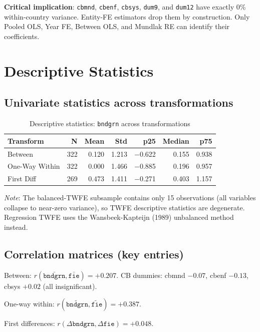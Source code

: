 \documentclass[12pt,a4paper]{article}
\begin{document}
\noindent\textbf{Critical implication}: \texttt{cbmnd}, \texttt{cbenf},
\texttt{cbsys}, \texttt{dum9}, and \texttt{dum12} have exactly 0\%
within-country variance. Entity-FE estimators drop them by construction.
Only Pooled OLS, Year FE, Between OLS, and Mundlak RE can identify their
coefficients.

\section{Descriptive Statistics}

\subsection{Univariate statistics across transformations}

\begin{table}[H]
\centering
\caption{Descriptive statistics: \texttt{bndgrn} across transformations}
\label{tab:desc}
\begin{tabular}{lrrrrrr}
\toprule
Transform & N & Mean & Std & p25 & Median & p75 \\
\midrule
Between        & 322 &  0.120 & 1.213 & $-$0.622 &  0.155 & 0.938 \\
One-Way Within & 322 &  0.000 & 1.466 & $-$0.885 &  0.196 & 0.957 \\
First Diff     & 269 &  0.473 & 1.411 & $-$0.271 &  0.403 & 1.157 \\
\bottomrule
\end{tabular}
\end{table}

\noindent\textit{Note}: The balanced-TWFE subsample contains only 15
observations (all variables collapse to near-zero variance), so TWFE
descriptive statistics are degenerate. Regression TWFE uses the
Wansbeek-Kapteijn (1989) unbalanced method instead.

\subsection{Correlation matrices (key entries)}

Between: $r(\bar{\texttt{bndgrn}}, \bar{\texttt{fie}}) = +0.207$.
CB dummies: cbmnd $-0.07$, cbenf $-0.13$, cbsys $+0.02$ (all insignificant).

One-way within: $r(\widetilde{\texttt{bndgrn}}, \widetilde{\texttt{fie}}) = +0.387$.

First differences: $r(\Delta\texttt{bndgrn}, \Delta\texttt{fie}) = +0.048$.
\end{document}
